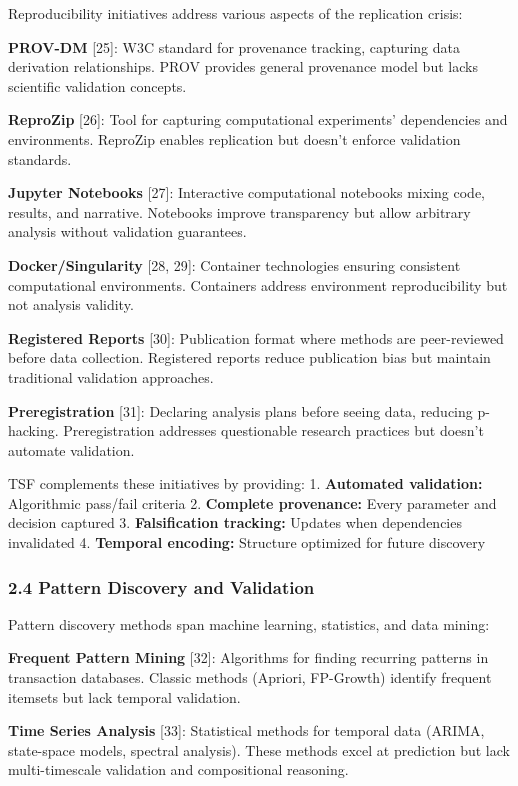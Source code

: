\documentclass[
]{article}
\begin{document}
Reproducibility initiatives address various aspects of the replication
crisis:

\textbf{PROV-DM} {[}25{]}: W3C standard for provenance tracking,
capturing data derivation relationships. PROV provides general
provenance model but lacks scientific validation concepts.

\textbf{ReproZip} {[}26{]}: Tool for capturing computational
experiments' dependencies and environments. ReproZip enables replication
but doesn't enforce validation standards.

\textbf{Jupyter Notebooks} {[}27{]}: Interactive computational notebooks
mixing code, results, and narrative. Notebooks improve transparency but
allow arbitrary analysis without validation guarantees.

\textbf{Docker/Singularity} {[}28, 29{]}: Container technologies
ensuring consistent computational environments. Containers address
environment reproducibility but not analysis validity.

\textbf{Registered Reports} {[}30{]}: Publication format where methods
are peer-reviewed before data collection. Registered reports reduce
publication bias but maintain traditional validation approaches.

\textbf{Preregistration} {[}31{]}: Declaring analysis plans before
seeing data, reducing p-hacking. Preregistration addresses questionable
research practices but doesn't automate validation.

TSF complements these initiatives by providing: 1. \textbf{Automated
validation:} Algorithmic pass/fail criteria 2. \textbf{Complete
provenance:} Every parameter and decision captured 3.
\textbf{Falsification tracking:} Updates when dependencies invalidated
4. \textbf{Temporal encoding:} Structure optimized for future discovery

\subsubsection{2.4 Pattern Discovery and
Validation}\label{pattern-discovery-and-validation}

Pattern discovery methods span machine learning, statistics, and data
mining:

\textbf{Frequent Pattern Mining} {[}32{]}: Algorithms for finding
recurring patterns in transaction databases. Classic methods (Apriori,
FP-Growth) identify frequent itemsets but lack temporal validation.

\textbf{Time Series Analysis} {[}33{]}: Statistical methods for temporal
data (ARIMA, state-space models, spectral analysis). These methods excel
at prediction but lack multi-timescale validation and compositional
reasoning.
\end{document}
